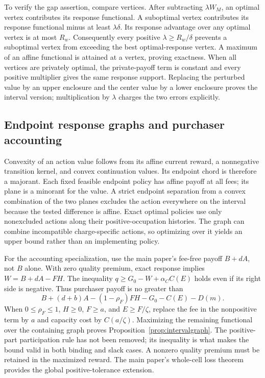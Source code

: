 To verify the gap assertion, compare vertices. After subtracting $\lambda W_M$, an optimal vertex contributes its response functional. A suboptimal vertex contributes its response functional minus at least $\lambda\delta$. Its response advantage over any optimal vertex is at most $R_w$. Consequently every positive $\lambda\geq R_w/\delta$ prevents a suboptimal vertex from exceeding the best optimal-response vertex. A maximum of an affine functional is attained at a vertex, proving exactness. When all vertices are privately optimal, the private-payoff term is constant and every positive multiplier gives the same response support. Replacing the perturbed value by an upper enclosure and the center value by a lower enclosure proves the interval version; multiplication by $\lambda$ charges the two errors explicitly.

\subsection{Endpoint response graphs and purchaser accounting}
Convexity of an action value follows from its affine current reward, a nonnegative transition kernel, and convex continuation values. Its endpoint chord is therefore a majorant. Each fixed feasible endpoint policy has affine payoff at all fees; its plane is a minorant for the value. A strict endpoint separation from a convex combination of the two planes excludes the action everywhere on the interval because the tested difference is affine. Exact optimal policies use only nonexcluded actions along their positive-occupation histories. The graph can combine incompatible charge-specific actions, so optimizing over it yields an upper bound rather than an implementing policy.

For the accounting specialization, use the main paper's fee-free payoff $B+dA$, not $B$ alone. With zero quality premium, exact response implies $W=B+dA-FH$. The inequality $q\geq G_0-W+\alpha_C C(E)$ holds even if its right side is negative. Thus purchaser payoff is no greater than
\[
 B+(d+b)A-(1-\rho_F)FH-G_0-C(E)-D(m).
\]
When $0\leq\rho_F\leq1$, $H\geq0$, $F\geq a$, and $E\geq F/\zeta$, replace the fee in the nonpositive term by $a$ and capacity cost by $C(a/\zeta)$. Maximizing the remaining functional over the containing graph proves Proposition~\ref{prop:intervalgraph}. The positive-part participation rule has not been removed; its inequality is what makes the bound valid in both binding and slack cases. A nonzero quality premium must be retained in the maximized reward. The main paper's whole-cell loss theorem provides the global positive-tolerance extension.

